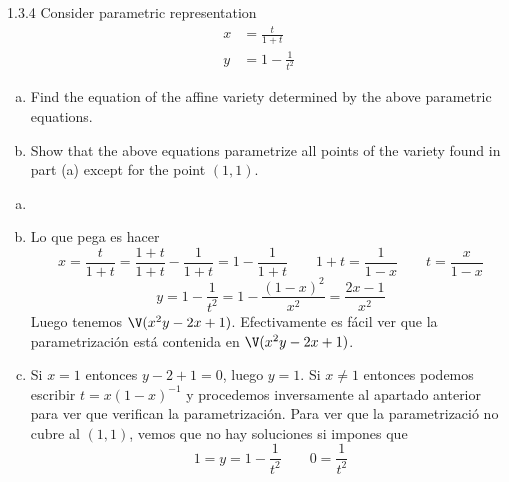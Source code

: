 \documentclass[twoside]{article}
\begin{document}
\begin{ejercicio}{1.3.4}
Consider parametric representation
\begin{align*}
x&=\frac{t}{1+t}\\
y&=1-\frac{1}{t^2}
\end{align*}
\begin{enumerate}[a)]
\item Find the equation of the affine variety determined by the above parametric equations.
\item Show that the above equations parametrize all points of the variety found in part
(a) except for the point $(1, 1)$.
\end{enumerate}
\end{ejercicio}
\begin{solucion}
\begin{enumerate}[a)]
\item[]
\item Lo que pega es hacer 
$$
x=\frac{t}{1+t} = \frac{1+t}{1+t}-\frac{1}{1+t} = 1 -\frac{1}{1+t}\qquad 1+t= \frac{1}{1-x} \qquad
t = \frac{x}{1-x}
$$
$$
y = 1-\frac{1}{t^2} = 1 - \frac{(1-x)^2}{x^2} = \frac{2x-1}{x^2}
$$
Luego tenemos $\V(x^2y-2x+1)$. Efectivamente es fácil ver que la parametrización está contenida en $\V(x^2y-2x+1)$. \item Si $x=1$ entonces $y-2+1=0$, luego $y=1$. Si $x\neq 1$ entonces podemos escribir 
$t=x(1-x)^{-1}$ y procedemos inversamente al apartado anterior para ver que verifican la parametrización. Para ver que la parametrizació no cubre al $(1,1)$, vemos que no hay soluciones si impones que
$$
1=y=1-\frac{1}{t^2} \qquad 0 = \frac{1}{t^2}
$$
\end{enumerate}
\end{solucion}

\newpage
\end{document}
